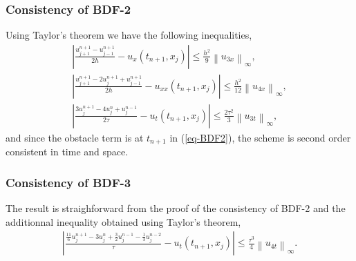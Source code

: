 \documentclass[12pt,a4paper]{article}
\newcommand{\ninf}[1]{\left\| {#1} \right\|_\infty}
\newcommand{\abs}[1]{\left\vert {#1} \right\vert}
\begin{document}
		\subsubsection{Consistency of BDF-2}

Using Taylor's theorem we have the following inequalities,
\begin{align*}
\abs{ \frac{u_{j+1}^{n+1}-u_{j-1}^{n+1}}{2h} - u_x(t_{n+1},x_j) } \leq \frac{h^2}{9} \ninf{u_{3x}}, \\
\abs{ \frac{u_{j+1}^{n+1}-2u_{j}^{n+1}+u_{j-1}^{n+1}}{2h} - u_{xx}(t_{n+1},x_j) } \leq \frac{h^2}{12} \ninf{u_{4x}}, \\
\abs{ \frac{3u_{j}^{n+1} - 4u_{j}^{n} + u_{j}^{n-1}}{2 \tau} - u_t(t_{n+1},x_j) } \leq \frac{2 \tau^2}{3} \ninf{u_{3t}},
\end{align*}
and since the obstacle term is at $t_{n+1}$ in (\ref{eq-BDF2}), the scheme is second order consistent in time and space.

		\subsubsection{Consistency of BDF-3}

The result is straighforward from the proof of the consistency of BDF-2 and the additionnal inequality obtained using Taylor's theorem,
\begin{align*}
\abs{ \frac{\frac{11}{6} u_j^{n+1} - 3 u_j^n + \frac{3}{2} u_j^{n-1} - \frac{1}{3} u_j^{n-2}}{\tau} - u_t(t_{n+1},x_j) } \leq \frac{\tau^3}{4} \ninf{u_{4t}}.
\end{align*}


\newpage


\end{document}
